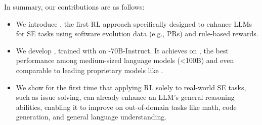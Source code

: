 In summary, our contributions are as follows:
\begin{itemize}
\item We introduce \tech, the first RL approach specifically designed to enhance LLMs for SE tasks using software evolution data (e.g., PRs) and rule-based rewards.
\item We develop \ours[70], trained with \tech on -70B-Instruct. It achieves \textbf{\swebfinalbig{\%}} on \swebverified, the best performance among medium-sized language models (<100B) and even comparable to leading proprietary models like .
\item We show for the first time that applying RL solely to real-world SE tasks, such as issue solving, can already enhance an LLM's general reasoning abilities, enabling it to improve on out-of-domain tasks like math, code generation, and general language understanding.
\end{itemize}

